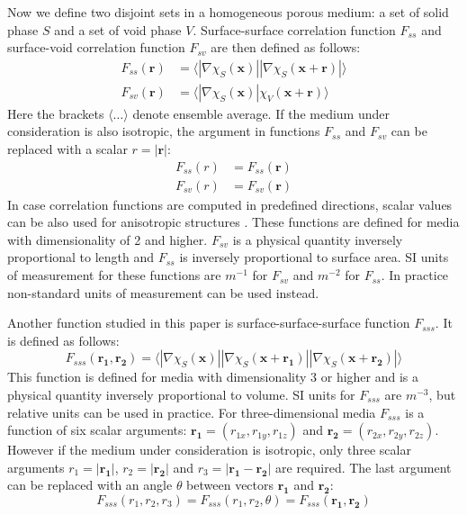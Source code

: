 \documentclass[reprint,amsmath,amssymb,aps,pre,showkeys,showpacs]{revtex4-1}
\begin{document}
Now we define two disjoint sets in a homogeneous porous medium: a set of solid
phase $S$ and a set of void phase $V$. Surface-surface correlation function
$F_{ss}$ and surface-void correlation function $F_{sv}$ are then defined as follows:
\begin{align}
  F_{ss}(\bm{r}) &= \langle |\nabla \chi_S(\bm{x})| |\nabla \chi_S(\bm{x} +
  \bm{r})| \rangle \label{eq:fss} \\
  F_{sv}(\bm{r}) &= \langle |\nabla \chi_S(\bm{x})| \chi_V(\bm{x} +
  \bm{r}) \rangle \label{eq:fsv}
\end{align}
Here the brackets $\langle \dots \rangle$ denote ensemble average. If the medium
under consideration is also isotropic, the argument in functions $F_{ss}$ and
$F_{sv}$ can be replaced with a scalar $r = |\bm{r}|$:
\begin{align*}
  F_{ss}(r) &= F_{ss}(\bm{r}) \\
  F_{sv}(r) &= F_{sv}(\bm{r})
\end{align*}
In case correlation functions are computed in predefined directions, scalar
values can be also used for anisotropic structures
\cite{jiao2014chawla,EPL1}. These functions are defined for media with
dimensionality of 2 and higher. $F_{sv}$ is a physical quantity inversely
proportional to length and $F_{ss}$ is inversely proportional to surface
area. SI units of measurement for these functions are $m^{-1}$ for $F_{sv}$
and $m^{-2}$ for $F_{ss}$. In practice non-standard units of measurement can be
used instead.

Another function studied in this paper is surface-surface-surface function
$F_{sss}$. It is defined as follows:
\begin{equation}
  F_{sss}(\bm{r_1}, \bm{r_2}) = \langle |\nabla \chi_S(\bm{x})|
  |\nabla \chi_S(\bm{x} + \bm{r_1})|
  |\nabla \chi_S(\bm{x} + \bm{r_2})|
  \rangle \label{eq:fsss}
\end{equation}
This function is defined for media with dimensionality 3 or higher and is a
physical quantity inversely proportional to volume. SI units for $F_{sss}$ are
$m^{-3}$, but relative units can be used in practice. For three-dimensional media
$F_{sss}$ is a function of six scalar arguments:
$\bm{r_1} = (r_{1x}, r_{1y}, r_{1z})$ and $\bm{r_2} = (r_{2x}, r_{2y}, r_{2z})$.
However if the medium under consideration is isotropic, only three scalar
arguments $r_1 = |\bm{r_1}|$, $r_2 = |\bm{r_2}|$ and $r_3 = |\bm{r_1} - \bm{r_2}|$
are required. The last argument can be replaced with an angle $\theta$ between
vectors $\bm{r_1}$ and $\bm{r_2}$:
\begin{equation*}
  F_{sss}(r_1, r_2, r_3) = F_{sss}(r_1, r_2, \theta) = F_{sss}(\bm{r_1}, \bm{r_2})
\end{equation*}
\end{document}
